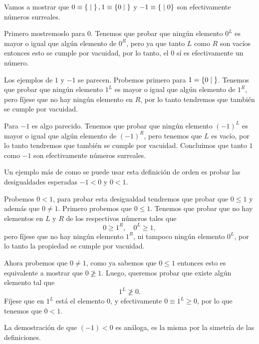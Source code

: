     \begin{example}
        Vamos a mostrar que $0\equiv \left\{\;\middle|\; \right\}, 1\equiv\left\{0\;\middle|\; \right\}$ y $-1\equiv\left\{\;\middle|\; 0\right\}$ son efectivamente n\'umeros surreales.

        Primero mostremoslo para $0$. Tenemos que probar que ning\'un elemento $0^L$ es mayor o igual que algún elemento de $0^R$, pero ya que tanto $L$ como $R$ son vac\'ios entonces esto se cumple por vacuidad, por lo tanto, el $0$ s\'i es efectivamente un n\'umero.

        Los ejemplos de $1$ y $-1$ se parecen. Probemos primero para $1=\left\{0\;\middle|\; \right\}$. Tenemos que probar que ning\'un elemento $1^L$ es mayor o igual que algún elemento de $1^R$, pero f\'ijese que no hay ning\'un elemento en $R
        $, por lo tanto tendremos que tambi\'en se cumple por vacuidad.

        Para $-1$ es algo parecido. Tenemos que probar que ning\'un elemento $(-1)^L$ es mayor o igual que alg\'un elemento de $(-1)^R$, pero tenemos que $L$ es vac\'io, por lo tanto tendremos que tambi\'en se cumple por vacuidad. Concluimos que tanto $1$ como $-1$ son efectivamente n\'umeros surreales.
    \end{example}

    \begin{example}\label{ExFirstOrder}
        Un ejemplo m\'as de como se puede usar esta definici\'on de orden es probar las desigualdades esperadas $-1< 0$ y $0<1$.

        Probemos $0 < 1$, para probar esta desigualdad tendremos que probar que $0\le 1$ y adem\'as que $0 \not= 1$. Primero probemos que $0\le 1$. Tenemos que probar que no hay elementos en $L$ y $R$ de los respectivos n\'umeros tales que
        \[
            0 \ge 1^R, \quad 0^L \ge 1,
        \]
        pero f\'ijese que no hay ningún elemento $1^R$, ni tampoco ningún elemento $0^L$, por lo tanto la propiedad se cumple por vacuidad.

        Ahora probemos que $0 \not= 1$, como ya sabemos que $0\le 1$ entonces esto es equivalente a mostrar que $0\not\ge 1$. Luego, queremos probar que existe alg\'un elemento tal que
        \[
            1^L \not\ge 0.
        \]
        F\'ijese que en $1^L$ est\'a el elemento $0$, y efectivamente $0 \equiv 1^L \ge 0$, por lo que tenemos que $0 < 1$.

        La demostraci\'on de que $(-1) < 0$ es an\'aloga, es la misma por la simetr\'ia de las definiciones.
    \end{example}

